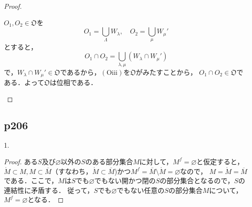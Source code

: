 \documentclass[dvipdfmx,uplatex,11pt]{jsarticle}
\begin{document}
\begin{leftbar}
\begin{proof}
\begin{itemize}
            $O_1 , O_2 \in \mathfrak{O}$を
            \[
                O_1 = \bigcup_{\Lambda} W_\lambda , \quad O_2 = \bigcup_{\mu} W_{\mu} '
            \]
            とすると，
            \[
                O_1 \cap O_2 = \bigcup_{\lambda , \mu} (W_\lambda \cap W_{\mu} ')
            \]
            で，$W_\lambda \cap W_{\mu} ' \in \mathfrak{O}$であるから，$(\mathrm{O} \mathrm{iii})$を$\mathfrak{O}$がみたすことから，
            $O_1 \cap O_2 \in \mathfrak{O}$である．よって$\mathfrak{O}$は位相である．
        \end{itemize}
    \end{proof}
\end{leftbar}
\newpage
    \subsection{p206}
    1.
    \begin{leftbar}
        \begin{proof}
    ある$S$及び$\varnothing$以外の$S$のある部分集合$M$に対して，$M^f=\varnothing$と仮定すると，
    $\mathring{M}\subset M,M\subset\overline{M}$（すなわち，$\mathring{M}\subset\overline{M}$)かつ$M^f=\overline{M}\setminus\mathring{M}=\varnothing$なので，
$M=\mathring{M}=\overline{M}$である．ここで，$M$は$S$でも$\varnothing$でもない開かつ閉の$S$の部分集合となるので，$S$の連結性に矛盾する．
従って，$S$でも$\varnothing$でもない任意の$S$の部分集合$M$について，$M^f=\varnothing$となる．
        \end{proof}
    \end{leftbar}
    \newpage
\end{document}
